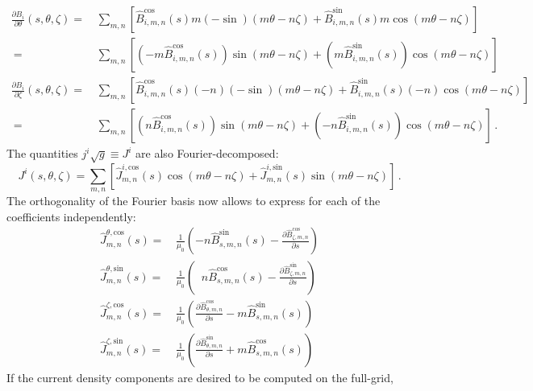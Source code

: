 \begin{align}
 \frac{\partial B_i}{\partial \theta}(s, \theta, \zeta)
 =&\, \sum\limits_{m,n} \left[
   \hat{B}^\textrm{cos}_{i,m,n}(s) m (-\sin)(m \theta - n \zeta) +
   \hat{B}^\textrm{sin}_{i,m,n}(s) m   \cos (m \theta - n \zeta)
 \right] \nonumber \\ ~
 =&\, \sum\limits_{m,n} \left[
   \left(-m \hat{B}^\textrm{cos}_{i,m,n}(s)\right) \sin(m \theta - n \zeta) +
   \left( m \hat{B}^\textrm{sin}_{i,m,n}(s)\right) \cos(m \theta - n \zeta)
 \right] \\
 \frac{\partial B_i}{\partial \zeta}(s, \theta, \zeta)
 =&\, \sum\limits_{m,n} \left[
   \hat{B}^\textrm{cos}_{i,m,n}(s) (-n) (-\sin)(m \theta - n \zeta) +
   \hat{B}^\textrm{sin}_{i,m,n}(s) (-n) \cos(m \theta - n \zeta)
 \right] \nonumber \\ ~
 =&\, \sum\limits_{m,n} \left[
   \left( n \hat{B}^\textrm{cos}_{i,m,n}(s)\right) \sin(m \theta - n \zeta) +
   \left(-n \hat{B}^\textrm{sin}_{i,m,n}(s)\right) \cos(m \theta - n \zeta)
 \right] \, .
\end{align}
%
The quantities $j^i \sqrt{g} \equiv J^i$ are also Fourier-decomposed:
\begin{equation}
 J^i(s, \theta, \zeta) = \sum\limits_{m,n} \left[
   \hat{J}^{i,\textrm{cos}}_{m,n}(s) \cos(m \theta - n \zeta) +
   \hat{J}^{i,\textrm{sin}}_{m,n}(s) \sin(m \theta - n \zeta)
 \right] \, .
\end{equation}
%
The orthogonality of the Fourier basis now allows to express 
for each of the coefficients independently:
\begin{align}
 \hat{J}^{\theta,\textrm{cos}}_{m,n}(s) =&\, \frac{1}{\mu_0} \left(
   -n \hat{B}^\textrm{sin}_{s,m,n}(s) - \frac{\partial \hat{B}^\textrm{cos}_{\zeta,m,n}}{\partial s}
 \right) \\
 \hat{J}^{\theta,\textrm{sin}}_{m,n}(s) =&\, \frac{1}{\mu_0} \left(
   ~ \,\, n \hat{B}^\textrm{cos}_{s,m,n}(s) - \frac{\partial \hat{B}^\textrm{sin}_{\zeta,m,n}}{\partial s}
 \right) \\
 \hat{J}^{\zeta,\textrm{cos}}_{m,n}(s) =&\, \frac{1}{\mu_0} \left(
   \frac{\partial \hat{B}^\textrm{cos}_{\theta,m,n}}{\partial s} - m \hat{B}^\textrm{sin}_{s,m,n}(s)
 \right) \\
 \hat{J}^{\zeta,\textrm{sin}}_{m,n}(s) =&\, \frac{1}{\mu_0} \left(
   \frac{\partial \hat{B}^\textrm{sin}_{\theta,m,n}}{\partial s} + m \hat{B}^\textrm{cos}_{s,m,n}(s)
 \right)
\end{align}
%
If the current density components are desired to be computed on the full-grid,
